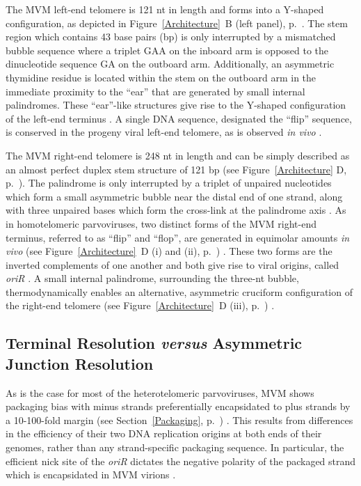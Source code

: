 The MVM left-end telomere is 121 nt in length and forms into a Y-shaped configuration, as depicted in Figure~\ref{Architecture}~B (left panel), p.~\pageref{Architecture}. The stem region which contains 43 base pairs (bp) is only interrupted by a mismatched bubble sequence where a triplet GAA on the inboard arm is opposed to the dinucleotide sequence GA on the outboard arm. Additionally, an asymmetric thymidine residue is located within the stem on the outboard arm in the immediate proximity to the ``ear'' that are generated by small internal palindromes. These ``ear''-like structures give rise to the Y-shaped configuration of the left-end terminus \cite{pmid225040, pmid6298737, pmid3973977, replication}. A single DNA sequence, designated the ``flip'' sequence, is conserved in the progeny viral left-end telomere, as is observed \textit{in vivo} \cite{pmid3973977}.  

The MVM right-end telomere is 248 nt in length and can be simply described as an almost perfect duplex stem structure of 121 bp (see Figure~\ref{Architecture} D, p.~\pageref{Architecture}). The palindrome is only interrupted by a triplet of unpaired nucleotides which form a small asymmetric bubble near the distal end of one strand, along with three unpaired bases which form the cross-link at the palindrome axis \cite{pmid6298737, pmid3973977}. As in homotelomeric parvoviruses, two distinct forms of the MVM right-end terminus, referred to as ``flip'' and ``flop'', are generated in equimolar amounts \textit{in vivo} (see Figure~\ref{Architecture}~D (i) and (ii), p.~\pageref{Architecture}) \cite{telomere2, encapsidation}. These two forms are the inverted complements of one another and both give rise to viral origins, called \textit{oriR} \cite{pmid1388310, pmid9765384, pmid10627544}. A small internal palindrome, surrounding the three-nt bubble, thermodynamically enables an alternative, asymmetric cruciform configuration of the right-end telomere (see Figure~\ref{Architecture}~D (iii), p.~\pageref{Architecture}) \cite{pmid6602687}. 


\subsection{Terminal Resolution \textit{versus} Asymmetric Junction Resolution}
\label{Resolution}

As is the case for most of the heterotelomeric parvoviruses, MVM shows packaging bias with minus strands preferentially encapsidated to plus strands by a 10-100-fold margin (see Section~\ref{Packaging}, p.~\pageref{Packaging}) \cite{pmid6828378, pmid3296697}. This results from differences in the efficiency of their two DNA replication origins at both ends of their genomes, rather than any strand-specific packaging sequence. In particular, the efficient nick site of the \textit{oriR} dictates the negative polarity of the packaged strand which is encapsidated in MVM virions \cite{pmid15681430}. 

